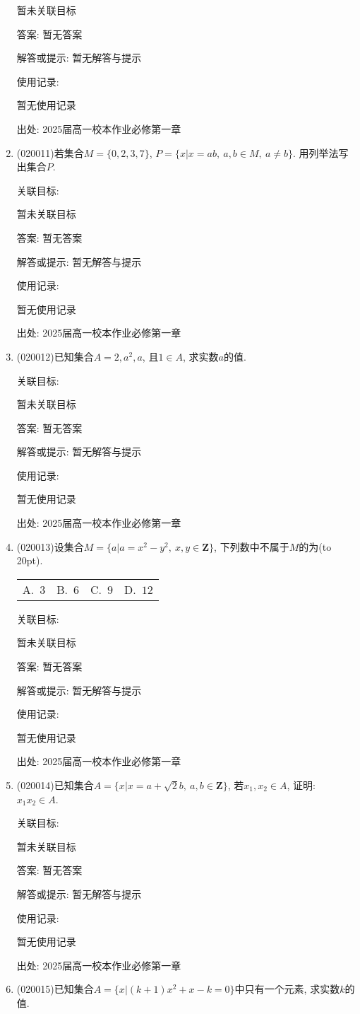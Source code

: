 \documentclass[10pt,a4paper]{article}
\newcommand{\bracket}[1]{(\hbox to #1pt{})}
\newcommand{\fourch}[4]{\par\begin{tabular}{p{.23\textwidth}p{.23\textwidth}p{.23\textwidth}p{.23\textwidth}}
A.~#1 &B.~#2& C.~#3& D.~#4
\end{tabular}}
\begin{document}
\begin{enumerate}[1.]
暂未关联目标

答案: 暂无答案

解答或提示: 暂无解答与提示

使用记录:

暂无使用记录


出处: 2025届高一校本作业必修第一章
\item { (020011)}若集合$M=\{0,2,3,7\}$, $P=\{x|x=ab,\ a,b\in M, \ a\ne b\}$. 用列举法写出集合$P$.


关联目标:

暂未关联目标

答案: 暂无答案

解答或提示: 暂无解答与提示

使用记录:

暂无使用记录


出处: 2025届高一校本作业必修第一章
\item { (020012)}已知集合$A={2, a^2, a}$, 且$1\in A$, 求实数$a$的值.


关联目标:

暂未关联目标

答案: 暂无答案

解答或提示: 暂无解答与提示

使用记录:

暂无使用记录


出处: 2025届高一校本作业必修第一章
\item { (020013)}设集合$M=\{a|a=x^2-y^2, \ x,y\in\mathbf{Z}\}$, 下列数中不属于$M$的为\bracket{20}.
\fourch{$3$}{$6$}{$9$}{$12$}


关联目标:

暂未关联目标

答案: 暂无答案

解答或提示: 暂无解答与提示

使用记录:

暂无使用记录


出处: 2025届高一校本作业必修第一章
\item { (020014)}已知集合$A=\{x|x=a+\sqrt 2b,\ a,b\in \mathbf{Z}\}$, 若$x_1,x_2\in A$, 证明: $x_1x_2\in A$.


关联目标:

暂未关联目标

答案: 暂无答案

解答或提示: 暂无解答与提示

使用记录:

暂无使用记录


出处: 2025届高一校本作业必修第一章
\item { (020015)}已知集合$A=\{x|(k+1)x^2+x-k=0\}$中只有一个元素, 求实数$k$的值.



\end{enumerate}
\end{document}
